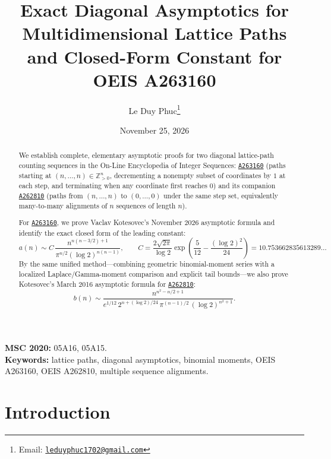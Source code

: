 \documentclass[11pt,a4paper]{article}
\title{Exact Diagonal Asymptotics for Multidimensional Lattice Paths\\
and Closed-Form Constant for OEIS A263160}
\author{Le Duy Phuc\thanks{Email: \href{mailto:leduyphuc1702@gmail.com}{\texttt{leduyphuc1702@gmail.com}}}}
\date{November 25, 2026}
\theoremstyle{remark}
\newcommand{\oeis}[1]{\href{https://oeis.org/#1}{\texttt{#1}}}
\begin{document}
\maketitle

\begin{abstract}
We establish complete, elementary asymptotic proofs for two diagonal lattice-path counting sequences in the On-Line Encyclopedia of Integer Sequences: \oeis{A263160} (paths starting at $(n,\dots,n)\in\mathbb{Z}_{>0}^n$, decrementing a nonempty subset of coordinates by $1$ at each step, and terminating when any coordinate first reaches $0$) and its companion \oeis{A262810} (paths from $(n,\dots,n)$ to $(0,\dots,0)$ under the same step set, equivalently many-to-many alignments of $n$ sequences of length $n$).

For \oeis{A263160}, we prove Vaclav Kotesovec's November 2026 asymptotic formula and identify the exact closed form of the leading constant:
\[
  a(n) \sim C\,\frac{n^{n(n-3/2)+1}}{\pi^{n/2}(\log 2)^{n(n-1)}},
  \qquad
  C = \frac{2\sqrt{2\pi}}{\log 2}\exp\!\left(\frac{5}{12}-\frac{(\log 2)^2}{24}\right)
  = 10.753662835613289\ldots
\]
By the same unified method---combining geometric binomial-moment series with a localized Laplace/Gamma-moment comparison and explicit tail bounds---we also prove Kotesovec's March 2016 asymptotic formula for \oeis{A262810}:
\[
  b(n) \sim \frac{n^{n^2 - n/2 + 1}}{e^{1/12}\,2^{n + (\log 2)/24}\,\pi^{(n-1)/2}\,(\log 2)^{n^2+1}}.
\]
\end{abstract}

\noindent\textbf{MSC 2020:} 05A16, 05A15.\\
\textbf{Keywords:} lattice paths, diagonal asymptotics, binomial moments, OEIS A263160, OEIS A262810, multiple sequence alignments.

\section{Introduction}
\end{document}
